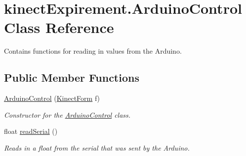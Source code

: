 \hypertarget{classkinect_expirement_1_1_arduino_control}{}\section{kinect\+Expirement.\+Arduino\+Control Class Reference}
\label{classkinect_expirement_1_1_arduino_control}


Contains functions for reading in values from the Arduino.  


\subsection*{Public Member Functions}
\begin{DoxyCompactItemize}
\item 
\hyperlink{classkinect_expirement_1_1_arduino_control_a8f7bceb5dfffc55120c77e4baee9074f}{Arduino\+Control} (\hyperlink{classkinect_expirement_1_1_kinect_form}{Kinect\+Form} f)
\begin{DoxyCompactList}\small\item\em Constructor for the {\ttfamily \hyperlink{classkinect_expirement_1_1_arduino_control}{Arduino\+Control}} class. \end{DoxyCompactList}\item 
float \hyperlink{classkinect_expirement_1_1_arduino_control_a49f81b66981e080da2324c09671a0335}{read\+Serial} ()
\begin{DoxyCompactList}\small\item\em Reads in a float from the serial that was sent by the Arduino. \end{DoxyCompactList}\end{DoxyCompactItemize}
